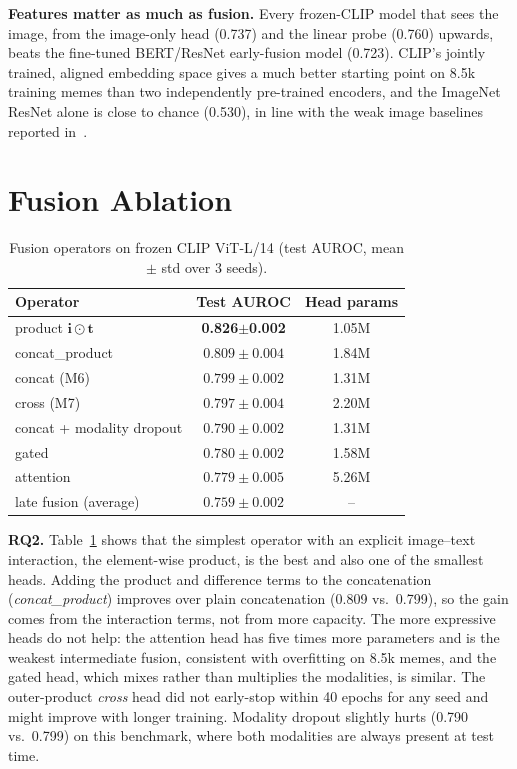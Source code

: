\documentclass[conference]{IEEEtran}
\newcommand{\best}[1]{\textbf{#1}}
\begin{document}
\textbf{Features matter as much as fusion.} Every frozen-CLIP model that sees the image, from the image-only head
(0.737) and the linear probe (0.760) upwards, beats the fine-tuned BERT/ResNet early-fusion model (0.723). CLIP's jointly trained, aligned embedding space gives a much better starting
point on 8.5k training memes than two independently pre-trained encoders, and the ImageNet ResNet alone is close to
chance (0.530), in line with the weak image baselines reported in~\cite{kiela2020}.

\section{Fusion Ablation}
\begin{table}[t]
\centering
\caption{Fusion operators on frozen CLIP ViT-L/14 (test AUROC, mean $\pm$ std over 3 seeds).}
\label{tab:ablation}
\begin{tabular}{lcc}
\toprule
Operator & Test AUROC & Head params \\
\midrule
product $\mathbf{i}\odot\mathbf{t}$ & \best{0.826}$\pm$\best{0.002} & 1.05M \\
concat\_product & $0.809\pm0.004$ & 1.84M \\
concat (M6) & $0.799\pm0.002$ & 1.31M \\
cross (M7) & $0.797\pm0.004$ & 2.20M \\
concat + modality dropout & $0.790\pm0.002$ & 1.31M \\
gated & $0.780\pm0.002$ & 1.58M \\
attention & $0.779\pm0.005$ & 5.26M \\
late fusion (average) & $0.759\pm0.002$ & -- \\
\bottomrule
\end{tabular}
\end{table}

\textbf{RQ2.} Table~\ref{tab:ablation} shows that the simplest operator with an explicit image--text interaction, the
element-wise product, is the best and also one of the smallest heads. Adding the product and difference terms to the
concatenation (\emph{concat\_product}) improves over plain concatenation (0.809 vs.\ 0.799), so the gain comes from
the interaction terms, not from more capacity. The more expressive heads do not help: the attention head has five
times more parameters and is the weakest intermediate fusion, consistent with overfitting on 8.5k memes, and the
gated head, which mixes rather than multiplies the modalities, is similar. The outer-product \emph{cross} head did not
early-stop within 40 epochs for any seed and might improve with longer training. Modality dropout slightly hurts
(0.790 vs.\ 0.799) on this benchmark, where both modalities are always present at test time.
\end{document}
